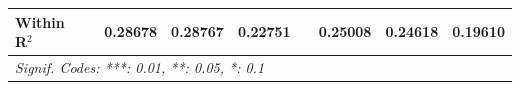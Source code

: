 \begin{table}[htbp]
{\begin{tabular}{lcccccccc}
      Within R$^2$              &                        & 0.28678                 & 0.28767                 & 0.22751                 &                         & 0.25008                 & 0.24618                 & 0.19610\\  
      \midrule \midrule
      \multicolumn{9}{l}{\emph{Signif. Codes: ***: 0.01, **: 0.05, *: 0.1}}\\
   \end{tabular}}
\end{table}


